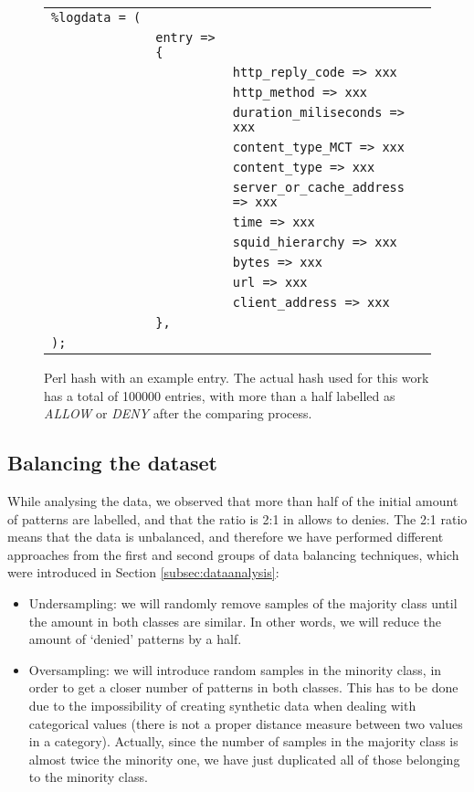 \documentclass{llncs}
\begin{document}
\begin{figure}[htb]
\centering
\begin{tabular}{ p{0.1cm} p{0.1cm} p{6cm} }
  \texttt{\%logdata~=~(} & & \\
   & \texttt{entry~=>\{} & \\
   & & \texttt{http\_reply\_code => xxx} \\
   & & \texttt{http\_method => xxx} \\
   & & \texttt{duration\_miliseconds => xxx} \\
   & & \texttt{content\_type\_MCT => xxx} \\
   & & \texttt{content\_type => xxx} \\
   & & \texttt{server\_or\_cache\_address => xxx} \\
   & & \texttt{time => xxx} \\
   & & \texttt{squid\_hierarchy => xxx} \\
   & & \texttt{bytes => xxx} \\
   & & \texttt{url => xxx} \\
   & & \texttt{client\_address => xxx} \\
   & \texttt{\},} & \\
  \texttt{);} & & \\
\end{tabular}
\caption{Perl hash with an example entry. The actual hash used for this work has a total of 100000 entries, with more than a half labelled as \textit{ALLOW} or \textit{DENY} after the comparing process. \label{fig:data_hash}}
\end{figure}

%
\subsection{Balancing the dataset}
\label{subsec:balancing}

While analysing the data, we observed that more than half of the initial amount of patterns are labelled, and that the ratio is 2:1 in allows to denies. The 2:1 ratio means that the data is unbalanced, and therefore we have performed different approaches from the first and second groups of data balancing techniques, which were introduced in Section \ref{subsec:dataanalysis}:

\begin{itemize}
\item Undersampling: we will randomly remove samples of the majority class until the amount in both classes are similar. In other words, we will reduce the amount of `denied' patterns by a half.
\item Oversampling: we will introduce random samples in the minority class, in order to get a closer number of patterns in both classes. This has to be done due to the impossibility of creating synthetic data when dealing with categorical values (there is not a proper distance measure between two values in a category). Actually, since the number of samples in the majority class is almost twice the minority one, we have just duplicated all of those belonging to the minority class.
\end{itemize}
\end{document}
